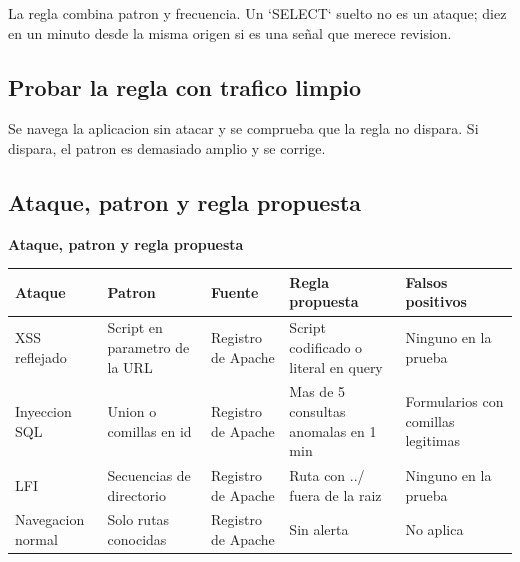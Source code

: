 \documentclass[11pt,a4paper]{article}
\begin{document}
La regla combina patron y frecuencia. Un `SELECT` suelto no es un ataque; diez en un minuto desde la misma origen si es una señal que merece revision.

\subsection{Probar la regla con trafico limpio}

Se navega la aplicacion sin atacar y se comprueba que la regla no dispara. Si dispara, el patron es demasiado amplio y se corrige.

\subsection{Ataque, patron y regla propuesta}

\begin{center}
\begin{minipage}{\linewidth}
\centering
{\footnotesize
\textbf{Ataque, patron y regla propuesta}\par\smallskip
\begin{tabular}{@{}>{\raggedright\arraybackslash}p{2.00cm}>{\raggedright\arraybackslash}p{3.20cm}>{\raggedright\arraybackslash}p{2.20cm}>{\raggedright\arraybackslash}p{3.60cm}>{\raggedright\arraybackslash}p{2.60cm}@{}}
\toprule
\textbf{Ataque} & \textbf{Patron} & \textbf{Fuente} & \textbf{Regla propuesta} & \textbf{Falsos positivos} \\
\midrule
XSS reflejado & Script en parametro de la URL & Registro de Apache & Script codificado o literal en query & Ninguno en la prueba \\
Inyeccion SQL & Union o comillas en id & Registro de Apache & Mas de 5 consultas anomalas en 1 min & Formularios con comillas legitimas \\
LFI & Secuencias de directorio & Registro de Apache & Ruta con ../ fuera de la raiz & Ninguno en la prueba \\
Navegacion normal & Solo rutas conocidas & Registro de Apache & Sin alerta & No aplica \\
\bottomrule
\end{tabular}
}
\par{}
\end{minipage}
\end{center}

\end{document}

